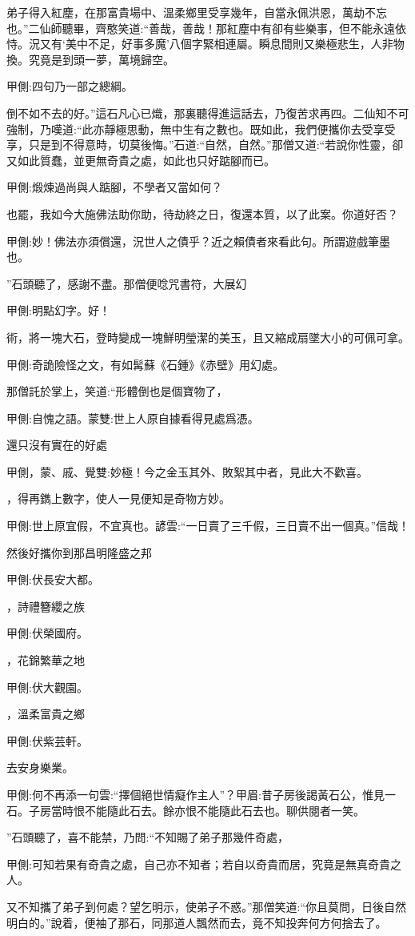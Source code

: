 \begin{parag}
弟子得入紅塵，在那富貴場中、溫柔鄉里受享幾年，自當永佩洪恩，萬劫不忘也。”二仙師聽畢，齊憨笑道:“善哉，善哉！那紅塵中有卻有些樂事，但不能永遠依恃。況又有‘美中不足，好事多魔’八個字緊相連屬。瞬息間則又樂極悲生，人非物換。究竟是到頭一夢，萬境歸空。\begin{note}甲側:四句乃一部之總綱。\end{note}倒不如不去的好。”這石凡心已熾，那裏聽得進這話去，乃復苦求再四。二仙知不可強制，乃嘆道:“此亦靜極思動，無中生有之數也。既如此，我們便攜你去受享受享，只是到不得意時，切莫後悔。”石道:“自然，自然。”那僧又道:“若說你性靈，卻又如此質蠢，並更無奇貴之處，如此也只好踮腳而已。\begin{note}甲側:煅煉過尚與人踮腳，不學者又當如何？\end{note}也罷，我如今大施佛法助你助，待劫終之日，復還本質，以了此案。你道好否？\begin{note}甲側:妙！佛法亦須償還，況世人之債乎？近之賴債者來看此句。所謂遊戲筆墨也。\end{note}”石頭聽了，感謝不盡。那僧便唸咒書符，大展幻\begin{note}甲側:明點幻字。好！\end{note}術，將一塊大石，登時變成一塊鮮明瑩潔的美玉，且又縮成扇墜大小的可佩可拿。\begin{note}甲側:奇詭險怪之文，有如髯蘇《石鍾》《赤壁》用幻處。\end{note}那僧託於掌上，笑道:“形體倒也是個寶物了，\begin{note}甲側:自愧之語。蒙雙:世上人原自據看得見處爲憑。\end{note}還只沒有實在的好處\begin{note}甲側，蒙、戚、覺雙:妙極！今之金玉其外、敗絮其中者，見此大不歡喜。\end{note}，得再鐫上數字，使人一見便知是奇物方妙。\begin{note}甲側:世上原宜假，不宜真也。諺雲:“一日賣了三千假，三日賣不出一個真。”信哉！\end{note}然後好攜你到那昌明隆盛之邦\begin{note}甲側:伏長安大都。\end{note}，詩禮簪纓之族\begin{note}甲側:伏榮國府。\end{note}，花錦繁華之地\begin{note}甲側:伏大觀園。\end{note}，溫柔富貴之鄉\begin{note}甲側:伏紫芸軒。\end{note}去安身樂業。\begin{note}甲側:何不再添一句雲:“擇個絕世情癡作主人”？甲眉:昔子房後謁黃石公，惟見一石。子房當時恨不能隨此石去。餘亦恨不能隨此石去也。聊供閱者一笑。\end{note}”石頭聽了，喜不能禁，乃問:“不知賜了弟子那幾件奇處，\begin{note}甲側:可知若果有奇貴之處，自己亦不知者；若自以奇貴而居，究竟是無真奇貴之人。\end{note}又不知攜了弟子到何處？望乞明示，使弟子不惑。”那僧笑道:“你且莫問，日後自然明白的。”說着，便袖了那石，同那道人飄然而去，竟不知投奔何方何捨去了。

\end{parag}


